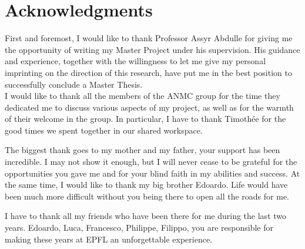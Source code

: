 \section*{Acknowledgments}

First and foremost, I would like to thank Professor Assyr Abdulle for giving me the opportunity of writing my Master Project under his supervision. His guidance and experience, together with the willingness to let me give my personal imprinting on the direction of this research, have put me in the best position to successfully conclude a Master Thesis. \\
I would like to thank all the members of the ANMC group for the time they dedicated me to discuss various aspects of my project, as well as for the warmth of their welcome in the group. In particular, I have to thank Timothée for the good times we spent together in our shared workspace.

\bigskip
\noindent The biggest thank goes to my mother and my father, your support has been incredible. I may not show it enough, but I will never cease to be grateful for the opportunities you gave me and for your blind faith in my abilities and success. At the same time, I would like to thank my big brother Edoardo. Life would have been much more difficult without you being there to open all the roads for me.

\bigskip
\noindent I have to thank all my friends who have been there for me during the last two years. Edoardo, Luca, Francesco, Philippe, Filippo, you are responsible for making these years at EPFL an unforgettable experience. 